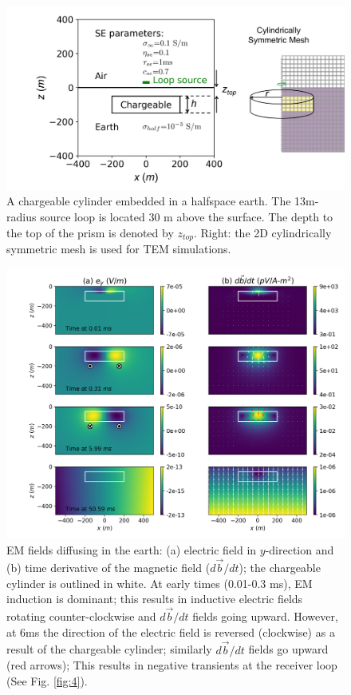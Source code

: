 \documentclass[manuscript]{geophysics}
\renewcommand {\b}  { {\vec b} }
\begin{document}
\begin{figure}[htb]
  \centering
  \includegraphics[width=1.0\textwidth]{figures/setup.png}
  \caption{A chargeable cylinder embedded in a halfspace earth. The 13m-radius source loop is located 30 m above the surface. The depth to the top of the prism is denoted by $z_{top}$.  Right: the 2D cylindrically symmetric mesh is used for TEM simulations.}
  \label{fig:2}
\end{figure}

\begin{figure}[htb]
  \centering
  \includegraphics[width=1.0\textwidth]{figures/fields.png}
  \caption{EM fields diffusing in the earth: (a) electric field in $y$-direction and (b) time derivative of the magnetic field ($d\b/dt$); the chargeable cylinder is outlined in white. At early times (0.01-0.3 ms), EM induction is dominant; this  results in inductive electric fields rotating counter-clockwise and $d\b/dt$ fields going upward. However, at 6ms the direction of the electric field is reversed (clockwise)  as a result of the chargeable cylinder; similarly $d\b/dt$ fields go upward (red arrows); This results in negative transients at the receiver loop (See Fig. \ref{fig:4}).}
  \label{fig:3}
\end{figure}
\end{document}
